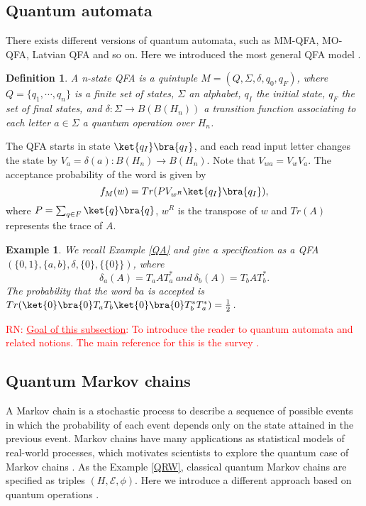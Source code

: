 \documentclass[a4paper, 11pt]{article}
\newtheorem{definition}{Definition}
\newtheorem{example}{Example}
\newcommand{\nevComment}[1]{\textcolor{red}{RN: #1}}
\newcommand{\half}{\frac{1}{2}}
\begin{document}
\subsection{Quantum automata}
There exists different versions of quantum automata, such as MM-QFA, MO-QFA, Latvian QFA and so on. Here we introduced the most general QFA model \cite{hirvensalo11,AA14}.
\begin{definition}
A n-state QFA is a quintuple $M=(Q,\Sigma,\delta,q_0,q_F)$, where $Q=\{q_1,\cdots,q_n\}$ is a finite set of states, $\Sigma$ an alphabet, $q_I$ the initial state, $q_F$ the set of final states, and $\delta:\Sigma\rightarrow B(B(H_n))$ a transition function associating to each letter $a\in \Sigma$ a quantum operation over $H_n$. 
\end{definition}
 
The QFA starts in state $\ket{q_I}\bra{q_I}$, and each read input letter changes the state by $V_a=\delta(a):B(H_n)\rightarrow B(H_n)$. Note that $V_{wa}=V_wV_a$. The acceptance probability of the word is given by 
$$f_{M}(w)=Tr(PV_{w^R}\ket{q_I}\bra{q_I}),$$
where $P=\sum_{q\in F}\ket{q}\bra{q}$, $w^R$ is the transpose of $w$ and $Tr(A)$ represents the trace of $A$. 

\begin{example}
We recall Example \ref{QA} and give a specification as a QFA $(\{0,1\},\{a,b\},\delta,\{0\},\{\{0\}\})$, where 
$$
\delta_a(A)=T_aAT_a^*\ and \
\delta_b(A)=T_bAT_b^*.
$$
The probability that the word $ba$ is accepted  is $Tr(\ket{0}\bra{0}T_aT_b\ket{0}\bra{0}T_b^*T_a^*)=\half$. 
\end{example}

\nevComment{\underline{Goal of this subsection}: To introduce the
  reader to quantum automata and related notions. The main reference for this is the
  survey \cite{hirvensalo11}.}

\subsection{Quantum Markov chains}
A Markov chain is a stochastic process to describe a sequence of possible events in which the probability of each event depends only on the state attained in the previous event. Markov chains have many applications as statistical models of real-world processes, which motivates scientists to explore the quantum case of Markov chains \cite{G08,LY15,D18}. As the Example \ref{QRW}, classical quantum Markov chains are specified as triples $(H,\mathcal{E},\phi)$. Here we introduce a different approach based on quantum operations \cite{G08}. 
\end{document}
